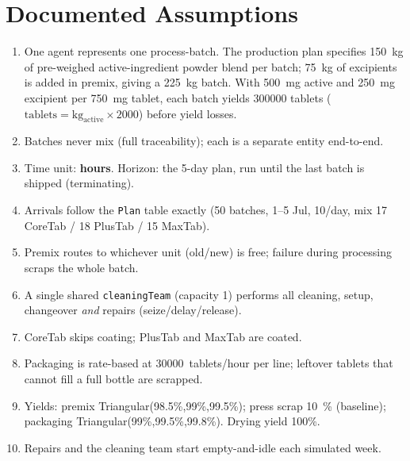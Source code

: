 \section{Documented Assumptions}
\label{sec:assumptions}

\begin{enumerate}\setlength\itemsep{1pt}
  \item One agent represents one process-batch. The production plan specifies
        \SI{150}{\kilo\gram} of pre-weighed active-ingredient powder blend per
        batch; \SI{75}{\kilo\gram} of excipients is added in premix, giving a
        \SI{225}{\kilo\gram} batch. With \SI{500}{\milli\gram} active and
        \SI{250}{\milli\gram} excipient per \SI{750}{\milli\gram} tablet, each
        batch yields \num{300000} tablets
        ($\text{tablets} = \text{kg}_{\text{active}} \times 2000$) before yield losses.
  \item Batches never mix (full traceability); each is a separate entity end-to-end.
  \item Time unit: \textbf{hours}. Horizon: the 5-day plan, run until the last
        batch is shipped (terminating).
  \item Arrivals follow the \texttt{Plan} table exactly (50 batches, 1--5 Jul,
        10/day, mix 17 CoreTab / 18 PlusTab / 15 MaxTab).
  \item Premix routes to whichever unit (old/new) is free; failure during
        processing scraps the whole batch.
  \item A single shared \texttt{cleaningTeam} (capacity 1) performs all cleaning,
        setup, changeover \emph{and} repairs (seize/delay/release).
  \item CoreTab skips coating; PlusTab and MaxTab are coated.
  \item Packaging is rate-based at \SI{30000}{tablets/hour} per line; leftover
        tablets that cannot fill a full bottle are scrapped.
  \item Yields: premix Triangular(98.5\%,99\%,99.5\%); press scrap \SI{10}{\percent}
        (baseline); packaging Triangular(99\%,99.5\%,99.8\%). Drying yield 100\%.
  \item Repairs and the cleaning team start empty-and-idle each simulated week.
\end{enumerate}
